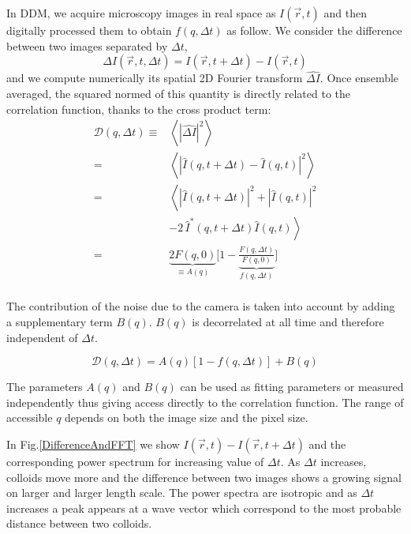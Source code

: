 \documentclass[%
 aip,
 jmp,%
 amsmath,amssymb,
reprint,%
]{revtex4-1}
\begin{document}
In DDM, we acquire microscopy images in real space as $I(\vec{r}, t)$ and then digitally processed them to obtain $f(q, \Delta t)$ as follow. We consider the difference between two images separated by $\Delta t$,
\begin{equation}
\Delta I(\vec{r},t, \Delta t) = I(\vec{r}, t+\Delta t) - I(\vec{r}, t)
\end{equation}
and we compute numerically its spatial 2D Fourier transform $\widehat{\Delta I}$. Once ensemble averaged, the squared normed of this quantity is directly related to the correlation function, thanks to the cross product term:
\begin{align*}
\mathcal{D}(q,\Delta t) \equiv& \left\langle \left|\widehat{\Delta I}\right|^2 \right\rangle\\
 =& \left\langle \left|\widehat{I}(q,t+\Delta t) - \widehat{I}(q,t)\right|^2 \right\rangle \\
=& \left\langle \left|\widehat{I}(q,t+ \Delta t)\right|^2 + \left|\widehat{I}(q,t)\right|^2\right. \\
&\left.- 2 \, \widehat{I}^*(q,t+\Delta t) \widehat{I}(q,t) \right\rangle\\
=& \underbrace{2F(q, 0)}_{\equiv A(q)} \bigg[ 1-\underbrace{\frac{F(q, \Delta t)}{F(q, 0)}}_{f(q, \Delta t)} \bigg]\\
\end{align*}

The contribution of the noise due to the camera is taken into account by adding a supplementary term $B(q)$. $B(q)$ is decorrelated  at all time and therefore independent of $\Delta t$.

\begin{equation}
\mathcal{D}(q,\Delta t) = A(q)\left[1-f(q, \Delta t)\right] + B(q)
\label{eq:D2f}
\end{equation}

The parameters $A(q)$ and $B(q)$ can be used as fitting parameters or measured independently thus giving access directly to the correlation function. The range of accessible $q$ depends on both the image size and the pixel size.

In Fig.\ref{DifferenceAndFFT} we show $I(\vec{r}, t)- I(\vec{r}, t+\Delta t)$ and the corresponding power spectrum for increasing value of $\Delta t$. As $\Delta t$ increases, colloids move more and the difference between two images shows a growing signal on larger and larger length scale. The power spectra are isotropic and as $\Delta t$ increases a peak appears at a wave vector which correspond to the most probable distance between two colloids.
\end{document}
